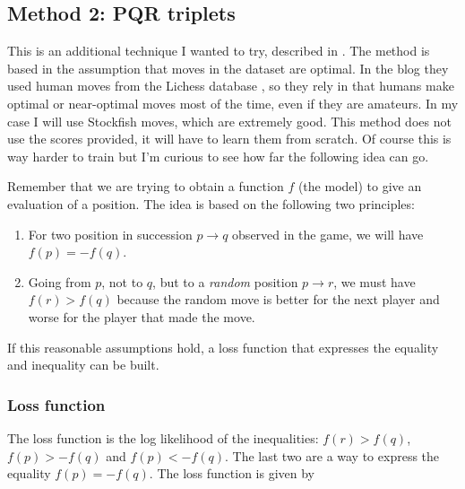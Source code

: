 \subsection{Method 2: PQR triplets}

This is an additional technique I wanted to try, described in \cite{dlchess:2014}. The method is based in the assumption that moves in the dataset are optimal. In the blog they used human moves from the Lichess database \cite{lichessdb}, so they rely in that humans make optimal or near-optimal moves most of the time, even if they are amateurs. In my case I will use Stockfish moves, which are extremely good. This method does not use the scores provided, it will have to learn them from scratch. Of course this is way harder to train but I'm curious to see how far the following idea can go.

Remember that we are trying to obtain a function $f$ (the model) to give an evaluation of a position. The idea is based on the following two principles:

\begin{enumerate}
\item For two position in succession $p \rightarrow q$ observed in the game, we will have $f(p)=-f(q)$.
\item Going from $p$, not to $q$, but to a \textit{random} position $p \rightarrow r$, we must have $f(r) > f(q)$ because the random move is better for the next player and worse for the player that made the move.
\end{enumerate}

If this reasonable assumptions hold, a loss function that expresses the equality and inequality can be built.


\subsubsection{Loss function}

The loss function is the log likelihood of the inequalities: $f(r) > f(q)$, $f(p) > - f(q)$ and $f(p) < -f(q)$. The last two are a way to express the equality $f(p)=-f(q)$. The loss function is given by


